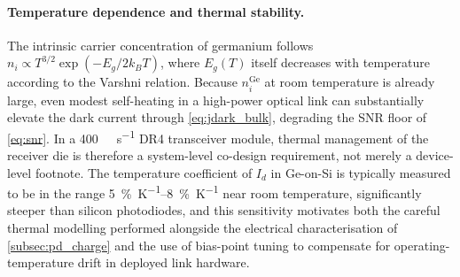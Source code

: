 \paragraph{Temperature dependence and thermal stability.}
The intrinsic carrier concentration of germanium follows
$n_i \propto T^{3/2}\exp(-E_g/2k_BT)$, where $E_g(T)$ itself decreases with
temperature according to the Varshni relation. Because $n_i^{\mathrm{Ge}}$ at
room temperature is already large, even modest self-heating in a high-power
optical link can substantially elevate the dark current through
\cref{eq:jdark_bulk}, degrading the SNR floor of \cref{eq:snr}. In a
\SI{400}{\giga\bit\per\second} DR4 transceiver module, thermal management
of the receiver die is therefore a system-level co-design requirement, not
merely a device-level footnote. The temperature coefficient of $I_d$ in
Ge-on-Si is typically measured to be in the range \SIrange{5}{8}{\percent\per\kelvin}
near room temperature, significantly steeper than silicon photodiodes, and this
sensitivity motivates both the careful thermal modelling performed alongside
the electrical characterisation of \cref{subsec:pd_charge} and the use of
bias-point tuning to compensate for operating-temperature drift in deployed
link hardware.
